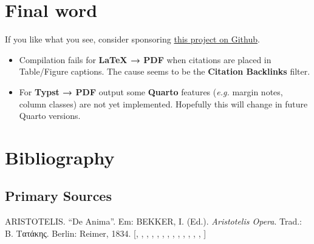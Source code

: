 \documentclass[
  10pt,
  oneside,
  cleardoublepage=empty,
  numbers=noenddot,
  titlepage,
  toclink=all,
  toc=bibliography,
  headinclude,
  footinclude]{scrbook}
\providecommand{\tightlist}{%
  \setlength{\itemsep}{0pt}\setlength{\parskip}{0pt}}\usepackage{longtable,booktabs,array}
\newlength{\cslhangindent}
\newenvironment{CSLReferences}[2] %
 {\begin{list}{}{%
  \setlength{\itemindent}{0pt}
  \setlength{\leftmargin}{0pt}
  \setlength{\parsep}{0pt}
  \ifodd #1
   \setlength{\leftmargin}{\cslhangindent}
   \setlength{\itemindent}{-1\cslhangindent}
  \fi
  \setlength{\itemsep}{#2\baselineskip}}}
 {\end{list}}
\theoremstyle{plain}
\theoremstyle{plain}
\theoremstyle{definition}
\theoremstyle{definition}
\theoremstyle{plain}
\theoremstyle{plain}
\theoremstyle{definition}
\theoremstyle{plain}
\theoremstyle{remark}
\begin{document}
\chapter{Final word}\label{final-word}

If you like what you see, consider sponsoring
\href{https://github.com/sponsors/bcdavasconcelos}{this project on
Github}.

\begin{tcolorbox}[enhanced jigsaw, bottomrule=.15mm, bottomtitle=1mm, rightrule=.15mm, opacityback=0, coltitle=black, colback=white, left=2mm, arc=.35mm, colbacktitle=quarto-callout-warning-color!10!white, breakable, toptitle=1mm, colframe=quarto-callout-warning-color-frame, toprule=.15mm, titlerule=0mm, title=\textcolor{quarto-callout-warning-color}{\faExclamationTriangle}\hspace{0.5em}{Known problems \& random errors}, leftrule=.75mm, opacitybacktitle=0.6]

\begin{itemize}
\tightlist
\item
  Compilation fails for \textbf{LaTeX → PDF} when citations are placed
  in Table/Figure captions. The cause seems to be the \textbf{Citation
  Backlinks} filter.
\item
  For \textbf{Typst → PDF} output some \textbf{Quarto} features
  (\emph{e.g.} margin notes, column classes) are not yet implemented.
  Hopefully this will change in future Quarto versions.
\end{itemize}

\end{tcolorbox}

\chapter*{Bibliography}\label{bibliography}

\section*{Primary Sources}\label{sec-primary-sources}

\label{refs_primary-sources}
\begin{CSLReferences}{0}{1}
ARISTOTELIS. {``De Anima''}. Em: BEKKER, I. (Ed.). \emph{Aristotelis
Opera}. Trad.: Β. Τατάκης. Berlin: Reimer, 1834.
{[},
\hyperref[cite_13]{\pageref{cite_13}},
\hyperref[cite_14]{\pageref{cite_14}},
\hyperref[cite_15]{\pageref{cite_15}},
\hyperref[cite_16]{\pageref{cite_16}},
\hyperref[cite_17]{\pageref{cite_17}},
\hyperref[cite_18]{\pageref{cite_18}},
\hyperref[cite_19]{\pageref{cite_19}},
\hyperref[cite_20]{\pageref{cite_20}},
\hyperref[cite_21]{\pageref{cite_21}},
\hyperref[cite_22]{\pageref{cite_22}},
\hyperref[cite_23]{\pageref{cite_23}},
\hyperref[cite_24]{\pageref{cite_24}},
\hyperref[cite_25]{\pageref{cite_25}}{]}

\end{CSLReferences}
\end{document}

